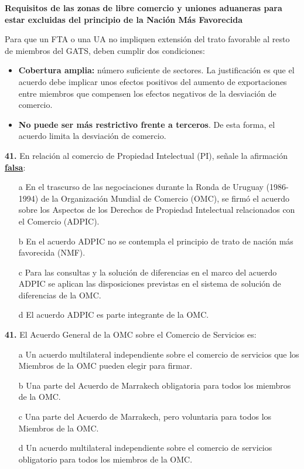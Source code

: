 \documentclass{nuevotema}
\begin{document}
\conceptos

\textbf{Requisitos de las zonas de libre comercio y uniones aduaneras para estar excluidas del principio de la Nación Más Favorecida}

Para que un FTA o una UA no impliquen extensión del trato favorable al resto de miembros del GATS, deben cumplir dos condiciones:
\begin{itemize}
	\item \textbf{Cobertura amplia:} número suficiente de sectores. La justificación es que el acuerdo debe implicar unos efectos positivos del aumento de exportaciones entre miembros que compensen los efectos negativos de la desviación de comercio.
	\item \textbf{No puede ser más restrictivo frente a terceros}. De esta forma, el acuerdo limita la desviación de comercio.
\end{itemize}

\preguntas


\textbf{41.} En relación al comercio de Propiedad Intelectual (PI), señale la afirmación \textbf{\underline{falsa}}:

\begin{itemize}
	\item[a] En el trascurso de las negociaciones durante la Ronda de Uruguay (1986-1994) de la Organización Mundial de Comercio (OMC), se firmó el acuerdo sobre los Aspectos de los Derechos de Propiedad Intelectual relacionados con el Comercio (ADPIC).
	\item[b] En el acuerdo ADPIC no se contempla el principio de trato de nación más favorecida (NMF).
	\item[c] Para las consultas y la solución de diferencias en el marco del acuerdo ADPIC se aplican las disposiciones previstas en el sistema de solución de diferencias de la OMC.
	\item[d] El acuerdo ADPIC es parte integrante de la OMC.
\end{itemize}



\textbf{41.} El Acuerdo General de la OMC sobre el Comercio de Servicios es:

\begin{itemize}
	\item[a] Un acuerdo multilateral independiente sobre el comercio de servicios que los Miembros de la OMC pueden elegir para firmar.
	\item[b] Una parte del Acuerdo de Marrakech obligatoria para todos los miembros de la OMC.
	\item[c] Una parte del Acuerdo de Marrakech, pero voluntaria para todos los Miembros de la OMC.
	\item[d] Un acuerdo multilateral independiente sobre el comercio de servicios obligatorio para todos los miembros de la OMC.
\end{itemize}
\end{document}
